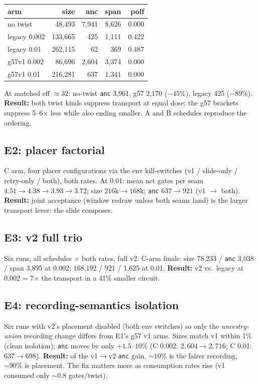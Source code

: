 \documentclass[11pt]{article}
\newcommand{\code}[1]{\texttt{#1}}
\begin{document}
\begin{center}\small
\begin{tabular}{lrrrr}
\toprule
arm & size & anc & span & polf \\
\midrule
no twist     & 48{,}493  & 7{,}941 & 8{,}626 & 0.000 \\
legacy 0.002 & 133{,}665 & 425     & 1{,}111 & 0.422 \\
legacy 0.01  & 262{,}115 & 62      & 369     & 0.487 \\
g57v1 0.002  & 86{,}696  & 2{,}604 & 3{,}374 & 0.000 \\
g57v1 0.01   & 216{,}281 & 637     & 1{,}341 & 0.000 \\
\bottomrule
\end{tabular}
\end{center}

At matched eff ${\approx}32$: no-twist \code{anc} 3{,}961, g57 2{,}170
($-45\%$), legacy 425 ($-89\%$). \textbf{Result:} both twist kinds suppress
transport at equal dose; the g57 brackets suppress 5--6$\times$ less while
also ending smaller. A and B schedules reproduce the ordering.

\subsection{E2: placer factorial}
C arm, four placer configurations via the env kill-switches
(v1 / slide-only / retry-only / both), both rates. At 0.01: mean net gates
per seam $4.51 \to 4.38 \to 3.93 \to 3.72$; size $216\mathrm{k} \to
168\mathrm{k}$; \code{anc} $637 \to 921$ (v1 $\to$ both). \textbf{Result:}
joint acceptance (window redraw unless both seams land) is the larger
transport lever; the slide composes.

\subsection{E3: v2 full trio}
Six runs, all schedules $\times$ both rates, full v2. C-arm finals:
size 78{,}233 / \code{anc} 3{,}038 / span 3{,}895 at 0.002; 168{,}192 /
921 / 1{,}625 at 0.01. \textbf{Result:} v2 vs.\ legacy at 0.002 = 7$\times$
the transport in a 41\% smaller circuit.

\subsection{E4: recording-semantics isolation}\label{sec:union}
Six runs with v2's placement disabled (both env switches) so only the
\emph{ancestry-union} recording change differs from E1's g57 v1 arms.
Sizes match v1 within 1\% (clean isolation); \code{anc} moves by only
$+1.5$--$10\%$ (C 0.002: $2{,}604 \to 2{,}716$; C 0.01: $637 \to 698$).
\textbf{Result:} of the v1$\to$v2 \code{anc} gain, ${\sim}10\%$ is the
fairer recording, ${\sim}90\%$ is placement. The fix matters more as
consumption rates rise (v1 consumed only ${\sim}0.8$ gates/twist).
\end{document}
